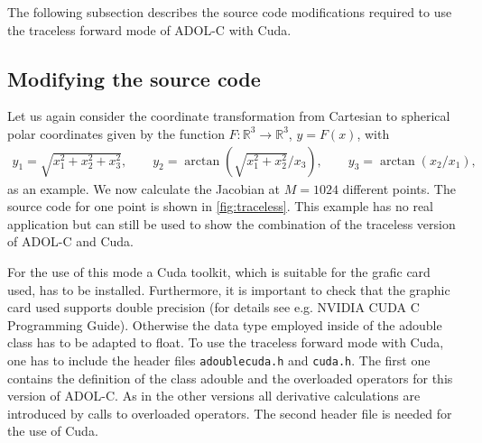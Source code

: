 \documentclass[11pt,twoside]{article}
\begin{document}
The following subsection describes the source code modifications required to use 
the traceless forward mode of ADOL-C with Cuda.  

\subsection{Modifying the source code}

Let us again consider the coordinate transformation from Cartesian to spherical
polar coordinates given by the function $F: \mathbb{R}^3 \to \mathbb{R}^3$, $y
= F(x)$, with
\begin{eqnarray*}
y_1  =  \sqrt{x_1^2 + x_2^2 + x_3^2},\qquad
y_2  =  \arctan\left(\sqrt{x_1^2 + x_2^2}/x_3\right),\qquad
y_3  =  \arctan(x_2/x_1),
\end{eqnarray*}
as an example. We now calculate the Jacobian at $M=1024$ different points.
The source code for one point is shown in \autoref{fig:traceless}. This example 
has no real application but can still be used to show the combination of the traceless version
of ADOL-C and Cuda.

For the use of this mode a Cuda toolkit, which is suitable for the grafic card used,
has to be installed. Furthermore, it is important to check that the graphic card
used supports double precision (for details see e.g. NVIDIA CUDA C Programming Guide).
Otherwise the data type employed inside of the {\sf adouble} class has to be adapted
to {\sf float}. To use the traceless forward mode with Cuda, one has to include the header
files \verb#adoublecuda.h# and \verb#cuda.h#. The first one contains the 
definition of the class {\sf adouble} and the overloaded operators
for this version of ADOL-C. As in the other versions all derivative 
calculations are introduced by calls to overloaded operators. The 
second header file is needed for the use of Cuda.  
\end{document}
